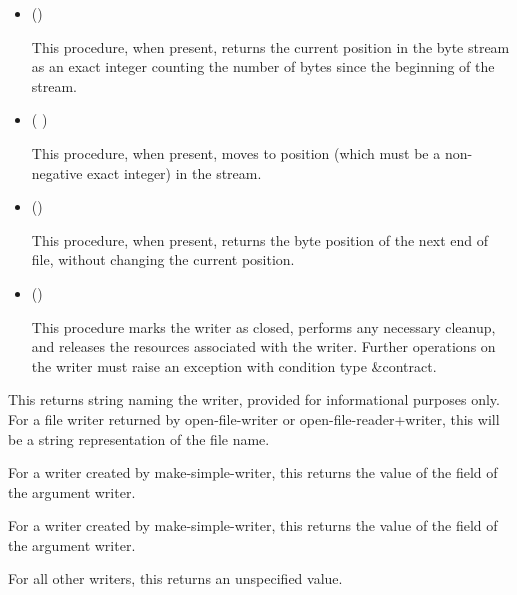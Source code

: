 \begin{entry}{%
}
\begin{itemize}
   may or may not be a bytes object returned by {\cf
    make-i/o-buffer}. It is possible that {\cf writer-write!} operates more
  efficiently if it is, however.
  
   may or may not be the same as the chunk size of the
  reader. It is possible that {\cf writer-write!} operates more
  efficiently if it is, however.

\item {\cf ()}
   
  This procedure, when present, returns the current position in the byte
  stream as an exact integer counting the number of bytes since the
  beginning of the stream.
   
\item {\cf ( )}
   
  This procedure, when present, moves to position  (which must be a
  non-negative exact integer) in the stream.
  
\item {\cf ()}
   
    This procedure, when present, returns the byte position of the next end
    of file, without changing the current position.
   
\item {\cf ()}
  
  This procedure marks the writer as closed, performs any necessary
  cleanup, and releases the resources associated with the writer. Further
  operations on the writer must raise an exception with condition type
  {\cf\&contract}.
\end{itemize}
\end{entry}

\begin{entry}{%
}
   
This returns string naming the writer, provided for informational
purposes only. For a file writer returned by {\cf open-file-writer}
or {\cf open-file-reader+writer}, this will be a string
representation of the file name.
   
For a writer created by {\cf make-simple-writer}, this returns the
value of the  field of the argument writer.
\end{entry}

\begin{entry}{%
}
   
  For a writer created by {\cf make-simple-writer}, this returns the value of the
   field of the argument writer.
  
  For all other writers, this returns an unspecified value.
\end{entry}

